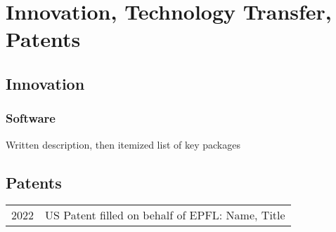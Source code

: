 \chapter{Innovation, Technology Transfer, Patents}
\vspace{-15pt}
\section{Innovation}

\subsection{Software}

Written description, then itemized list of key packages

\section{Patents}
\label{patent}
\begin{tabular}[l]{ p{} p{} }
2022 & US Patent filled on behalf of EPFL: Name, Title
\end{tabular} 



